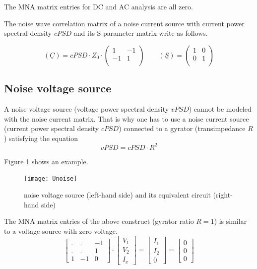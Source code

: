 The MNA matrix entries for DC and AC analysis are all zero.

\addvspace{12pt}

The noise wave correlation matrix of a noise current source with
current power spectral density $cPSD$ and its S parameter matrix
write as follows.

\begin{equation}
(\underline{C}) = cPSD\cdot Z_0\cdot
\begin{pmatrix}
   1 & -1\\
  -1 &  1\\
\end{pmatrix}
\qquad
(\underline{S}) =
\begin{pmatrix}
   1 &  0\\
   0 &  1\\
\end{pmatrix}
\end{equation}


\subsection{Noise voltage source}

A noise voltage source (voltage power spectral density $vPSD$) cannot
be modeled with the noise current matrix.  That is why one has to use
a noise current source (current power spectral density $cPSD$)
connected to a gyrator (transimpedance $R$) satisfying the equation
\begin{equation}
vPSD = cPSD \cdot R^2
\end{equation}

Figure \ref{fig:Unoise} shows an example.
\begin{figure}[ht]
\begin{center}
\texttt{[image: Unoise]}
\end{center}
\caption{noise voltage source (left-hand side) and its equivalent circuit (right-hand side)}
\label{fig:Unoise}
\end{figure}
\FloatBarrier

The MNA matrix entries of the above construct (gyrator ratio $R=1$) is
similar to a voltage source with zero voltage.
\begin{equation}
\begin{bmatrix}
.&.& -1\\
.&.& 1\\
1 & -1 & 0
\end{bmatrix}
\cdot
\begin{bmatrix}
V_{1}\\
V_{2}\\
I_x
\end{bmatrix}
=
\begin{bmatrix}
I_{1}\\
I_{2}\\
0
\end{bmatrix}
=
\begin{bmatrix}
0\\
0\\
0
\end{bmatrix}
\end{equation}

